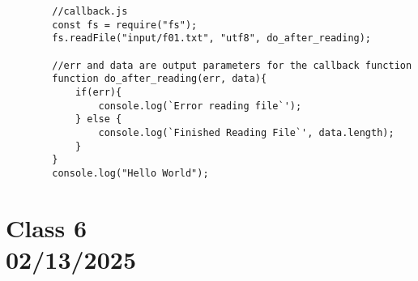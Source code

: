 \documentclass{article}
\begin{document}
\begin{itemize}
\begin{lstlisting}
        //callback.js
        const fs = require("fs");
        fs.readFile("input/f01.txt", "utf8", do_after_reading);

        //err and data are output parameters for the callback function
        function do_after_reading(err, data){
            if(err){
                console.log(`Error reading file`');
            } else {
                console.log(`Finished Reading File`', data.length);
            }
        }
        console.log("Hello World");
    \end{lstlisting}
\end{itemize}

\pagebreak
\section*{Class 6 \\ 02/13/2025}\label{sec:Class 6}
\end{document}
